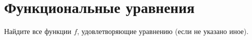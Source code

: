 
\section*{Функциональные уравнения}





Найдите все функции $f$, удовлетворяющие уравнению (если не указано иное).

